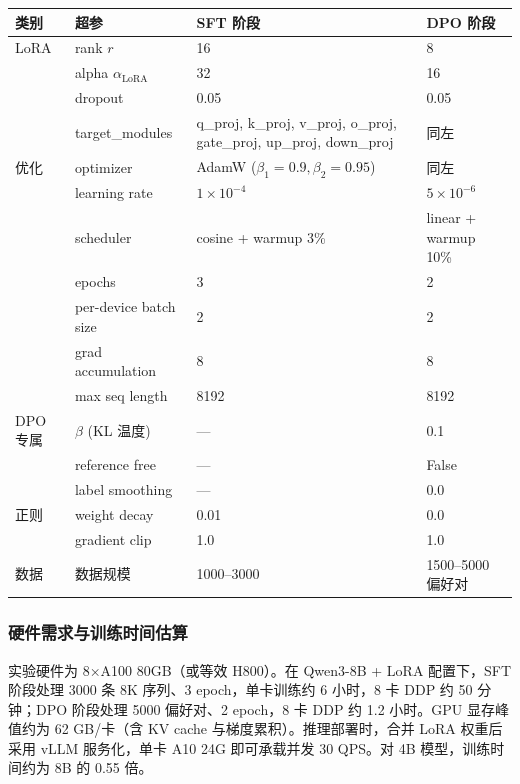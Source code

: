 \documentclass[a4paper,12pt]{ctexart}
\begin{document}
\begin{table}[htbp]
\centering
\small
\setlength{\tabcolsep}{4pt}
\begin{tabular}{|l|l|l|l|}
\hline
\textbf{类别} & \textbf{超参} & \textbf{SFT 阶段} & \textbf{DPO 阶段} \\
\hline
LoRA & rank $r$ & 16 & 8 \\
\hline
 & alpha $\alpha_{\mathrm{LoRA}}$ & 32 & 16 \\
\hline
 & dropout & 0.05 & 0.05 \\
\hline
 & target\_modules & q\_proj, k\_proj, v\_proj, o\_proj, gate\_proj, up\_proj, down\_proj & 同左 \\
\hline
优化 & optimizer & AdamW ($\beta_1=0.9,\beta_2=0.95$) & 同左 \\
\hline
 & learning rate & $1\!\times\!10^{-4}$ & $5\!\times\!10^{-6}$ \\
\hline
 & scheduler & cosine + warmup 3\% & linear + warmup 10\% \\
\hline
 & epochs & 3 & 2 \\
\hline
 & per-device batch size & 2 & 2 \\
\hline
 & grad accumulation & 8 & 8 \\
\hline
 & max seq length & 8192 & 8192 \\
\hline
DPO 专属 & $\beta$ (KL 温度) & — & 0.1 \\
\hline
 & reference free & — & False \\
\hline
 & label smoothing & — & 0.0 \\
\hline
正则 & weight decay & 0.01 & 0.0 \\
\hline
 & gradient clip & 1.0 & 1.0 \\
\hline
数据 & 数据规模 & 1000–3000 & 1500–5000 偏好对 \\
\hline
\end{tabular}
\end{table}

\subsubsection{硬件需求与训练时间估算}

实验硬件为 8×A100 80GB（或等效 H800）。在 Qwen3-8B + LoRA 配置下，SFT 阶段处理 3000 条 8K 序列、3 epoch，单卡训练约 6 小时，8 卡 DDP 约 50 分钟；DPO 阶段处理 5000 偏好对、2 epoch，8 卡 DDP 约 1.2 小时。GPU 显存峰值约为 62 GB/卡（含 KV cache 与梯度累积）。推理部署时，合并 LoRA 权重后采用 vLLM 服务化，单卡 A10 24G 即可承载并发 30 QPS。对 4B 模型，训练时间约为 8B 的 0.55 倍。
\end{document}
